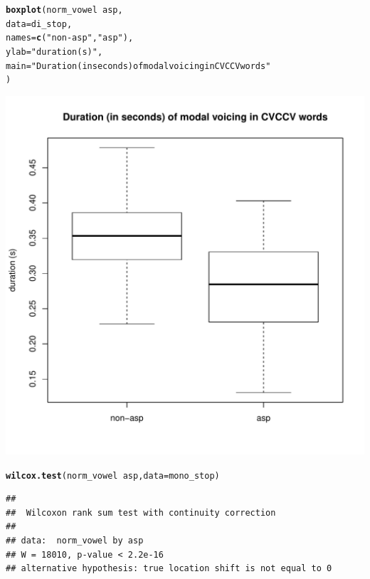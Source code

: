 \documentclass[a4paper,11pt]{article}\usepackage[]{graphicx}\usepackage[]{color}
\makeatletter
\def\maxwidth{ %
  \ifdim\Gin@nat@width>\linewidth
    \linewidth
  \else
    \Gin@nat@width
  \fi
}
\newcommand{\hlstr}[1]{\textcolor[rgb]{0.192,0.494,0.8}{#1}}%
\newcommand{\hlopt}[1]{\textcolor[rgb]{0,0,0}{#1}}%
\newcommand{\hlstd}[1]{\textcolor[rgb]{0.345,0.345,0.345}{#1}}%
\newcommand{\hlkwc}[1]{\textcolor[rgb]{0.333,0.667,0.333}{#1}}%
\newcommand{\hlkwd}[1]{\textcolor[rgb]{0.737,0.353,0.396}{\textbf{#1}}}%
\newenvironment{kframe}{%
 \def\at@end@of@kframe{}%
 \ifinner\ifhmode%
  \def\at@end@of@kframe{\end{minipage}}%
  \begin{minipage}{\columnwidth}%
 \fi\fi%
 \def\FrameCommand##1{\hskip\@totalleftmargin \hskip-\fboxsep
 \colorbox{shadecolor}{##1}\hskip-\fboxsep
     \hskip-\linewidth \hskip-\@totalleftmargin \hskip\columnwidth}%
 \MakeFramed {\advance\hsize-\width
   \@totalleftmargin\z@ \linewidth\hsize
   \@setminipage}}%
 {\par\unskip\endMakeFramed%
 \at@end@of@kframe}
\newenvironment{knitrout}{}{} %
\makeatother
\begin{document}
\begin{knitrout}
\color{fgcolor}\begin{kframe}
\begin{alltt}
\hlkwd{boxplot}\hlstd{(norm_vowel} \hlopt{~} \hlstd{asp,}
        \hlkwc{data} \hlstd{= di_stop,}
        \hlkwc{names} \hlstd{=} \hlkwd{c}\hlstd{(}\hlstr{"non-asp"}\hlstd{,} \hlstr{"asp"}\hlstd{),}
        \hlkwc{ylab} \hlstd{=} \hlstr{"duration (s)"}\hlstd{,}
        \hlkwc{main} \hlstd{=} \hlstr{"Duration (in seconds) of modal voicing in CVCCV words"}
        \hlstd{)}
\end{alltt}
\end{kframe}
\includegraphics[width=\maxwidth]{img/bi-stop-box-1} 

\end{knitrout}

\begin{knitrout}
\color{fgcolor}\begin{kframe}
\begin{alltt}
\hlkwd{wilcox.test}\hlstd{(norm_vowel} \hlopt{~} \hlstd{asp,} \hlkwc{data} \hlstd{= mono_stop)}
\end{alltt}
\begin{verbatim}
## 
## 	Wilcoxon rank sum test with continuity correction
## 
## data:  norm_vowel by asp
## W = 18010, p-value < 2.2e-16
## alternative hypothesis: true location shift is not equal to 0
\end{verbatim}
\end{kframe}
\end{knitrout}
\end{document}
